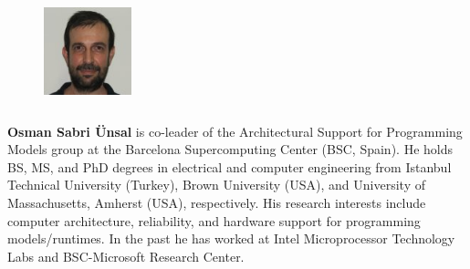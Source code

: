 \documentclass{article}
\begin{document}
  \begin{figure} 
    \includegraphics[width=1in,height=1.25in,clip,keepaspectratio]{pictures/osunsal.jpeg}
  \end{figure}\par
  \textbf{Osman Sabri {\"U}nsal} is co-leader of the Architectural Support for Programming Models group at the Barcelona Supercomputing Center (BSC, Spain). He holds BS, MS, and PhD degrees in electrical and computer engineering from Istanbul Technical University (Turkey), Brown University (USA), and University of Massachusetts, Amherst (USA), respectively. His research interests include computer architecture, reliability, and hardware support for programming models/runtimes. In the past he has
  worked at Intel Microprocessor Technology Labs and BSC-Microsoft Research Center.\par
  
\end{document}
